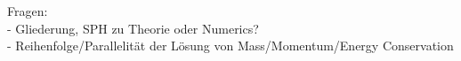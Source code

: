 Fragen:\\
- Gliederung, SPH zu Theorie oder Numerics? \\
- Reihenfolge/Parallelität der Lösung von Mass/Momentum/Energy Conservation \\